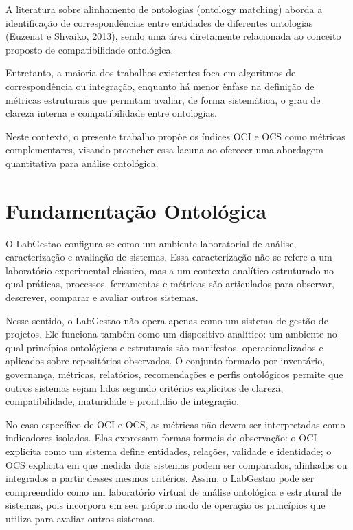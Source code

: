 \documentclass[12pt,a4paper]{article}
\begin{document}
A literatura sobre alinhamento de ontologias (ontology matching) aborda a identificação de correspondências entre entidades de diferentes ontologias (Euzenat e Shvaiko, 2013), sendo uma área diretamente relacionada ao conceito proposto de compatibilidade ontológica.

Entretanto, a maioria dos trabalhos existentes foca em algoritmos de correspondência ou integração, enquanto há menor ênfase na definição de métricas estruturais que permitam avaliar, de forma sistemática, o grau de clareza interna e compatibilidade entre ontologias.

Neste contexto, o presente trabalho propõe os índices OCI e OCS como métricas complementares, visando preencher essa lacuna ao oferecer uma abordagem quantitativa para análise ontológica.

\section{Fundamentação Ontológica}

O LabGestao configura-se como um ambiente laboratorial de análise, caracterização e avaliação de sistemas. Essa caracterização não se refere a um laboratório experimental clássico, mas a um contexto analítico estruturado no qual práticas, processos, ferramentas e métricas são articulados para observar, descrever, comparar e avaliar outros sistemas.

Nesse sentido, o LabGestao não opera apenas como um sistema de gestão de projetos. Ele funciona também como um dispositivo analítico: um ambiente no qual princípios ontológicos e estruturais são manifestos, operacionalizados e aplicados sobre repositórios observados. O conjunto formado por inventário, governança, métricas, relatórios, recomendações e perfis ontológicos permite que outros sistemas sejam lidos segundo critérios explícitos de clareza, compatibilidade, maturidade e prontidão de integração.

No caso específico de OCI e OCS, as métricas não devem ser interpretadas como indicadores isolados. Elas expressam formas formais de observação: o OCI explicita como um sistema define entidades, relações, validade e identidade; o OCS explicita em que medida dois sistemas podem ser comparados, alinhados ou integrados a partir desses mesmos critérios. Assim, o LabGestao pode ser compreendido como um laboratório virtual de análise ontológica e estrutural de sistemas, pois incorpora em seu próprio modo de operação os princípios que utiliza para avaliar outros sistemas.
\end{document}
